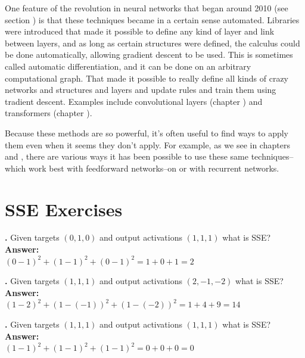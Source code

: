One feature of the revolution in neural networks that began around 2010 (see section ) is that these techniques became in a certain sense automated. Libraries were introduced that made it possible to define any kind of layer and link between layers, and as long as certain structures were defined, the calculus could be done automatically, allowing gradient descent to be used.  This is sometimes called automatic differentiation, and it can be done on an arbitrary computational graph.  That made it possible to really define all kinds of crazy networks and structures and layers and update rules and train them using tradient descent. Examples include convolutional layers (chapter ) and transformers  (chapter ).
 
Because these methods are so powerful, it's often useful to find ways to apply them even when it seems they don't apply. For example, as we see in chapters  and , there are various ways it has been possible to use these same techniques--which work best with feedforward networks--on or with recurrent networks.  
 
\section{SSE Exercises}


\noindent
{}
{\bf \theSSECounter.}  Given targets $(0,1,0)$ and output activations $(1,1,1)$ what is SSE? \\
{\bf Answer:}  \\
$(0-1)^2 + (1-1)^2 + (0-1)^2 = 1 + 0 + 1 = 2$
\bigskip

\noindent
{}
{\bf \theSSECounter.}  Given targets $(1,1,1)$ and output activations $(2,-1,-2)$ what is SSE? \\
{\bf Answer:}  \\
$(1-2)^2 + (1- (-1))^2 + (1-(-2))^2 = 1 + 4 + 9 = 14$
\bigskip

\noindent
{}
{\bf \theSSECounter.}  Given targets $(1,1,1)$ and output activations $(1,1,1)$ what is SSE? \\
{\bf Answer:}  \\
$(1-1)^2 + (1-1)^2 + (1-1)^2 = 0 + 0 + 0 = 0$
\bigskip
